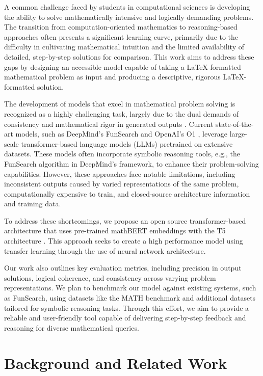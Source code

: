 \documentclass{article}
\begin{document}
A common challenge faced by students in computational sciences is developing the ability to solve mathematically intensive and logically demanding problems. The transition from computation-oriented mathematics to reasoning-based approaches often presents a significant learning curve, primarily due to the difficulty in cultivating mathematical intuition and the limited availability of detailed, step-by-step solutions for comparison. This work aims to address these gaps by designing an accessible model capable of taking a LaTeX-formatted mathematical problem as input and producing a descriptive, rigorous LaTeX-formatted solution.

The development of models that excel in mathematical problem solving is recognized as a highly challenging task, largely due to the dual demands of consistency and mathematical rigor in generated outputs \cite{Unsal_Gehr_Vechev_2024}. Current state-of-the-art models, such as DeepMind's FunSearch \cite{romera-paredes2024mathematical} and OpenAI's O1 \cite{openai2024o1preview}, leverage large-scale transformer-based language models (LLMs) pretrained on extensive datasets. These models often incorporate symbolic reasoning tools, e.g., the FunSearch algorithm in DeepMind's framework, to enhance their problem-solving capabilities. However, these approaches face notable limitations, including inconsistent outputs caused by varied representations of the same problem, computationally expensive to train, and closed-source architecture information and training data.

To address these shortcomings, we propose an open source transformer-based architecture that uses pre-trained mathBERT embeddings with the T5 architecture \cite{raffel2023exploringlimitstransferlearning}. This approach seeks to create a high performance model using transfer learning through the use of neural network architecture. 

Our work also outlines key evaluation metrics, including precision in output solutions, logical coherence, and consistency across varying problem representations. We plan to benchmark our model against existing systems, such as FunSearch, using datasets like the MATH benchmark and additional datasets tailored for symbolic reasoning tasks. Through this effort, we aim to provide a reliable and user-friendly tool capable of delivering step-by-step feedback and reasoning for diverse mathematical queries.
 \section{Background and Related Work}
\end{document}
